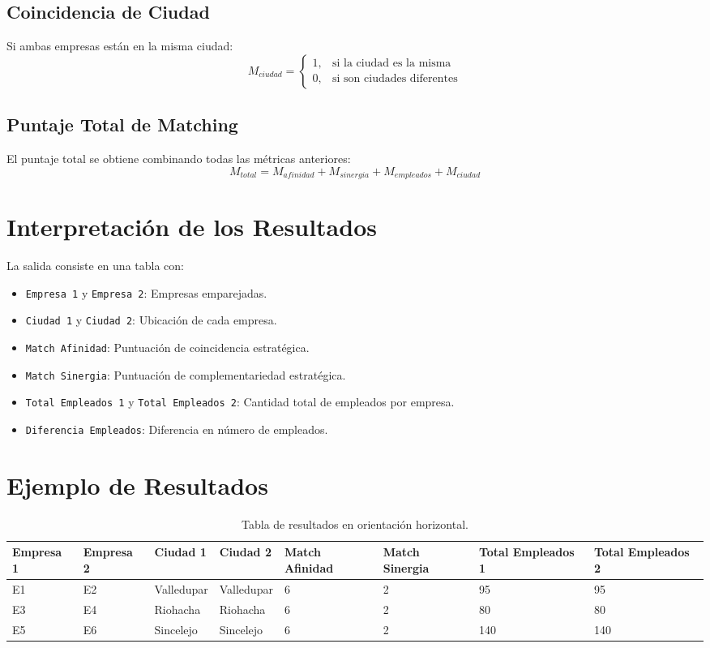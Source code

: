 \documentclass[a4paper,12pt]{article}
\begin{document}
\subsection{Coincidencia de Ciudad}
Si ambas empresas están en la misma ciudad:
\begin{equation}
M_{ciudad} = \begin{cases} 
1, & \text{si la ciudad es la misma} \\
0, & \text{si son ciudades diferentes} 
\end{cases}
\end{equation}

\subsection{Puntaje Total de Matching}
El puntaje total se obtiene combinando todas las métricas anteriores:
\begin{equation}
M_{total} = M_{afinidad} + M_{sinergia} + M_{empleados} + M_{ciudad}
\end{equation}

\section{Interpretación de los Resultados}
La salida consiste en una tabla con:
\begin{itemize}
    \item \texttt{Empresa 1} y \texttt{Empresa 2}: Empresas emparejadas.
    \item \texttt{Ciudad 1} y \texttt{Ciudad 2}: Ubicación de cada empresa.
    \item \texttt{Match Afinidad}: Puntuación de coincidencia estratégica.
    \item \texttt{Match Sinergia}: Puntuación de complementariedad estratégica.
    \item \texttt{Total Empleados 1} y \texttt{Total Empleados 2}: Cantidad total de empleados por empresa.
    \item \texttt{Diferencia Empleados}: Diferencia en número de empleados.
\end{itemize}

\section{Ejemplo de Resultados}
\begin{table}[h]
\centering
\begin{tabular}{|p{2.5cm}|p{2.5cm}|p{2cm}|p{2cm}|p{1.5cm}|p{1.5cm}|p{1.5cm}|p{1.5cm}|}
    \hline
    Empresa 1 & Empresa 2 & Ciudad 1 & Ciudad 2 & Match Afinidad & Match Sinergia & Total Empleados 1 & Total Empleados 2 \\
    \hline
    E1 & E2 & Valledupar & Valledupar & 6 & 2 & 95 & 95 \\
    E3 & E4 & Riohacha & Riohacha & 6 & 2 & 80 & 80 \\
    E5 & E6 & Sincelejo & Sincelejo & 6 & 2 & 140 & 140 \\
    \hline
\end{tabular}
\caption{Tabla de resultados en orientación horizontal.}
\end{table}
\end{document}
